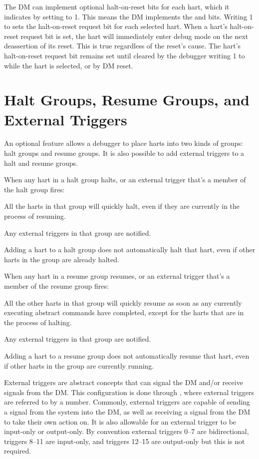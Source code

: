 The DM can implement optional halt-on-reset bits for each hart,
which it indicates by setting \FdmDmstatusHasresethaltreq to 1.
This means the DM implements the \FdmDmcontrolSetresethaltreq and \FdmDmcontrolClrresethaltreq bits.
Writing 1 to \FdmDmcontrolSetresethaltreq sets the halt-on-reset request bit for each
selected hart.
When a hart's halt-on-reset request bit is set, the hart will immediately enter
debug mode on the next deassertion of its reset. This is true regardless of
the reset's cause.
The hart's halt-on-reset request bit remains set
until cleared by the debugger writing 1 to \FdmDmcontrolClrresethaltreq
while the hart is selected, or by DM reset.

\section{Halt Groups, Resume Groups, and External Triggers}

An optional feature allows a debugger to place harts into two kinds of groups: halt
groups and resume groups.  It is also possible to add external triggers to a
halt and resume groups.

\begin{steps}{When any hart in a halt group halts, or an external trigger
    that's a member of the halt group fires:}
\item All the harts in that group will quickly halt, even if they are currently
    in the process of resuming.
\item Any external triggers in that group are notified.
\end{steps}
Adding a hart to a halt group does not automatically halt that hart, even if
other harts in the group are already halted.

\begin{steps}{When any hart in a resume group resumes, or an external trigger
    that's a member of the resume group fires:}
\item All the other harts in that group will quickly resume as soon as any
    currently executing abstract commands have completed, except for the harts
    that are in the process of halting.
\item Any external triggers in that group are notified.
\end{steps}
Adding a hart to a resume group does not automatically resume that hart, even
if other harts in the group are currently running.

External triggers are abstract concepts that can signal the DM and/or receive
signals from the DM. This configuration is done through \RdmDmcsTwo, where
external triggers are referred to by a number. Commonly, external triggers
are capable of sending a signal from the system into the DM, as well as
receiving a signal from the DM to take their own action on. It is also
allowable for an external trigger to be input-only or output-only. By
convention external triggers 0--7 are bidirectional, triggers 8--11 are
input-only, and triggers 12--15 are output-only but this is not required.

